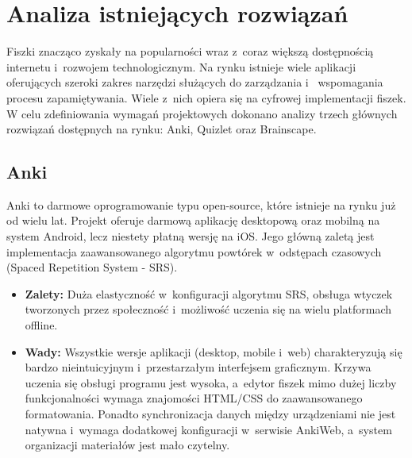 \section{Analiza istniejących rozwiązań}
Fiszki znacząco zyskały na popularności wraz z~coraz większą dostępnością internetu i~rozwojem technologicznym.
Na rynku istnieje wiele aplikacji oferujących szeroki zakres narzędzi służących do zarządzania i~
wspomagania procesu zapamiętywania. Wiele z~nich opiera się na cyfrowej implementacji fiszek. 
W celu zdefiniowania wymagań projektowych dokonano analizy trzech głównych rozwiązań dostępnych na rynku:
Anki, Quizlet oraz Brainscape.

\subsection*{Anki}
Anki to darmowe oprogramowanie typu open-source, które istnieje na rynku już od wielu lat. Projekt oferuje darmową aplikację 
desktopową oraz mobilną na system Android, lecz niestety płatną wersję na iOS. Jego główną zaletą jest 
implementacja zaawansowanego algorytmu powtórek w~odstępach czasowych (Spaced Repetition System - SRS).
\begin{itemize}
    \item \textbf{Zalety:} Duża elastyczność w~konfiguracji algorytmu SRS, obsługa wtyczek tworzonych przez społeczność i~możliwość 
    uczenia się na wielu platformach offline.
    \item \textbf{Wady:} Wszystkie wersje aplikacji (desktop, mobile i~web) charakteryzują się bardzo nieintuicyjnym i~przestarzałym interfejsem graficznym. 
    Krzywa uczenia się obsługi programu jest wysoka, a~edytor fiszek mimo dużej liczby funkcjonalności wymaga znajomości 
    HTML/CSS do zaawansowanego formatowania. Ponadto synchronizacja danych między urządzeniami nie jest natywna i~wymaga 
    dodatkowej konfiguracji w~serwisie AnkiWeb, a~system organizacji materiałów jest mało czytelny.
\end{itemize}

